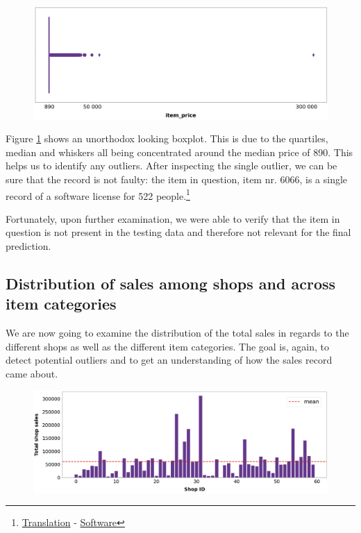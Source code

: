 \begin{figure}[h]
  \centering
  \includegraphics[width=0.78\linewidth]{external_content/graphs/outliers-item_price.png}
  \captionsetup{justification=centering}
  \label{fig:item_price_outliers}
\end{figure}

\vspace*{-4mm}
Figure \ref{fig:item_price_outliers} shows an unorthodox looking boxplot. This is due to the quartiles, median and whiskers all being concentrated around the median price of 890. This helps us to identify any outliers. After inspecting the single outlier, we can be sure that the record is not faulty: the item in question, item nr. 6066, is a single record of a software license for 522 people.\footnote{\href{https://translate.google.com/?sl=ru&tl=en&text=Radmin\%203\%20\%20-\%20522\%20\%D0\%BB\%D0\%B8\%D1\%86.&op=translate }{Translation} - \href{https://www.radmin.com/ordering/}{Software}}

Fortunately, upon further examination, we were able to verify that the item in question is not present in the testing data and therefore not relevant for the final prediction.

\subsection{Distribution of sales among shops and across item categories}

We are now going to examine the distribution of the total sales in regards to the different shops as well as the different item categories. The goal is, again, to detect potential outliers and to get an understanding of how the sales record came about.

\begin{figure}[h]
  \centering
  \includegraphics[width=0.78\linewidth]{external_content/graphs/distribution_amongst_shops.png}
  \captionsetup{justification=centering}
  \label{fig:distribution_amongst_shops}
\end{figure}

